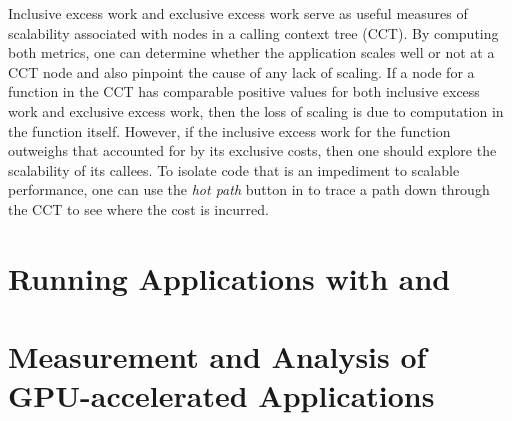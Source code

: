 \documentclass[11pt,letterpaper]{report}
\begin{document}
Inclusive excess work and exclusive excess work serve as useful measures of scalability associated with nodes in a calling context tree (CCT).
By computing both metrics, one can determine whether the application scales well or not at a CCT node and also pinpoint the cause of any lack of scaling.
If a node for a function in the CCT has comparable positive values for both inclusive excess work and exclusive excess work, then the loss of scaling is due to computation in the function itself.
However, if the inclusive excess work for the function outweighs that accounted for by its exclusive costs, then one should explore the scalability of its callees.
To isolate code that is an impediment to scalable performance, one can use the {\em hot path} button in \hpcviewer{} to trace a path down through the CCT to see where the cost is incurred.






\chapter{Running Applications with \hpcrun{} and \hpclink{}}
\label{chpt:hpcrun}





\chapter{Measurement and Analysis of GPU-accelerated Applications}
\label{chpt:gpu}




\end{document}
